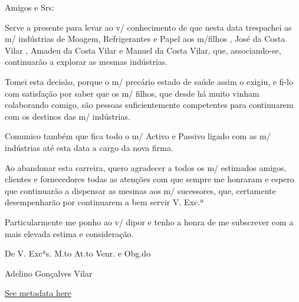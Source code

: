 \begin{center}
    \begin{minipage}{0.9\textwidth}
        \setlength{\parskip}{0.2cm}
        \setlength{\parindent}{0cm}
        \fontsize{12pt}{14pt}\selectfont
        


Amigos e Srs:

Serve a presente para levar ao v/ conhecimento de que nesta data
trespachei as m/ indústrias de Moagem, Refrigerantes e Papel aos
m/filhos , José da Costa Vilar , Amadeu da Costa Vilar e Manuel da Costa Vilar, que, associando-se, continuarão a explorar as mesmas
indústrias.

Tomei esta decisão, porque o m/ precário estado de saúde assim o exigiu,
e fi-lo com satisfação por saber que os m/ filhos, que desde há muito
vinham colaborando comigo, são pessoas suficientemente competentes para
continuarem com os destinos das m/ indústrias.

Comunico também que fica todo o m/ Activo e Passivo ligado com as m/
indústrias até esta data a cargo da nova firma.

Ao abandonar esta carreira, quero agradecer a todos os m/ estimados
amigos, clientes e fornecedores todas as atenções com que sempre me
honraram e espero que continuarão a dispensar as mesmas aos m/
sucessores, que, certamente desempenharão por continuarem a bem servir
V. Exc.ª

Particularmente me ponho ao v/ dipor e tenho a honra de me subscrever
com a mais elevada estima e consideração.

De V. Excªs. M.to At.to Venr. e Obg.do

Adelino Gonçalves Vilar

    \end{minipage}
\end{center}


\hyperref[table:\arabic{tablecounter}]{See metadata here}

\newpage

